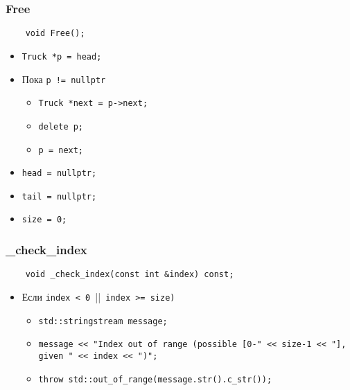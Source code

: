 \subsubsection{Free}

\begin{lstlisting}
    void Free();
\end{lstlisting}

\begin{itemize}
    \item \verb|Truck *p = head;|
    \item Пока \verb|p != nullptr|
        \begin{itemize}
            \item \verb|Truck *next = p->next;|
            \item \verb|delete p;|
            \item \verb|p = next;|
        \end{itemize}
    \item \verb|head = nullptr;|
    \item \verb|tail = nullptr;|
    \item \verb|size = 0;|
\end{itemize}

\subsubsection{\_check\_index}

\begin{lstlisting}
    void _check_index(const int &index) const;
\end{lstlisting}

\begin{itemize}
    \item Если \verb|index < 0 |||\verb| index >= size)|
        \begin{itemize}
            \item \verb|std::stringstream message;|
            \item \verb|message << "Index out of range (possible [0-" << size-1 << "], given " << index << ")";|
            \item \verb|throw std::out_of_range(message.str().c_str());|
        \end{itemize}
\end{itemize}